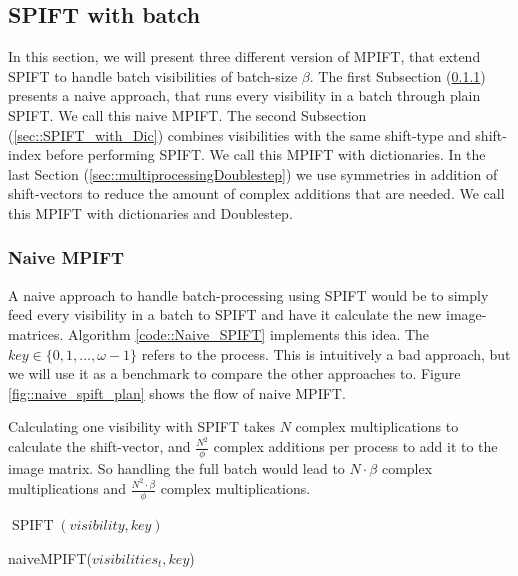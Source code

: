 \documentclass[12pt]{article}
\DeclareMathOperator{\SPIFT}{SPIFT}
\begin{document}
\subsection{SPIFT with batch}
\label{sec::spiftWithBatch}
	In this section, we will present three different version of MPIFT, that extend SPIFT to handle batch visibilities of batch-size $\beta$. The first Subsection (\ref{sec::Naive_Spift}) presents a naive approach, that runs every visibility in a batch through plain SPIFT. We call this naive MPIFT. The second Subsection (\ref{sec::SPIFT_with_Dic}) combines visibilities with the same shift-type and shift-index before performing SPIFT. We call this MPIFT with dictionaries. In the last Section (\ref{sec::multiprocessingDoublestep}) we use symmetries in addition of shift-vectors to reduce the amount of complex additions that are needed. We call this MPIFT with dictionaries and Doublestep.

\subsubsection{Naive MPIFT}
\label{sec::Naive_Spift}

A naive approach to handle batch-processing using SPIFT would be to simply feed every visibility in a batch to SPIFT and have it calculate the new image-matrices. Algorithm \ref{code::Naive_SPIFT} implements this idea. The $key\in \{0,1,\ldots,\omega-1\}$ refers to the process. This is intuitively a bad approach, but we will use it as a benchmark to compare the other approaches to. Figure \ref{fig::naive_spift_plan} shows the flow of naive MPIFT.

Calculating one visibility with SPIFT takes $N$ complex multiplications to calculate the shift-vector, and $\frac{N^2}{\phi}$ complex additions per process to add it to the image matrix. So handling the full batch would lead to $N\cdot \beta$ complex multiplications and $\frac{N^2\cdot \beta}{\phi}$ complex multiplications.

\begin{algorithm}
	\begin{algorithmic}[1]
				\State  $\SPIFT(visibility, key)$
		\EndFor
	\end{algorithmic}
\caption{naiveMPIFT(${visibilities}_t, key$)}
\label{code::Naive_SPIFT}
\end{algorithm}
\end{document}
